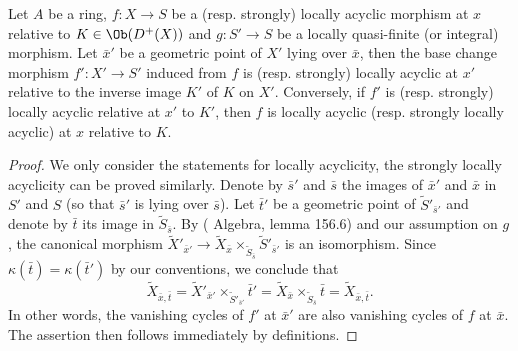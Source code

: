\begin{proposition}\label{scheme morphism locally acyclic base change by quasi-finite}
Let $A$ be a ring, $f:X\to S$ be a (resp. strongly) locally acyclic morphism at $x$ relative to $K\in\Ob(D^+(X))$ and $g:S'\to S$ be a locally quasi-finite (or integral) morphism. Let $\bar{x}'$ be a geometric point of $X'$ lying over $\bar{x}$, then the base change morphism $f':X'\to S'$ induced from $f$ is (resp. strongly) locally acyclic at $x'$ relative to the inverse image $K'$ of $K$ on $X'$. Conversely, if $f'$ is (resp. strongly) locally acyclic relative at $x'$ to $K'$, then $f$ is locally acyclic (resp. strongly locally acyclic) at $x$ relative to $K$. 
\end{proposition}
\begin{proof}
We only consider the statements for locally acyclicity, the strongly locally acyclicity can be proved similarly. Denote by $\bar{s}'$ and $\bar{s}$ the images of $\bar{x}'$ and $\bar{x}$ in $S'$ and $S$ (so that $\bar{s}'$ is lying over $\bar{s}$). Let $\bar{t}'$ be a geometric point of $\widetilde{S}'_{\bar{s}'}$ and denote by $\bar{t}$ its image in $\widetilde{S}_{\bar{s}}$. By (\cite{SP} Algebra, lemma 156.6) and our assumption on $g$, the canonical morphism $\widetilde{X}'_{\bar{x}'}\to\widetilde{X}_{\bar{x}}\times_{\widetilde{S}_{\bar{s}}}\widetilde{S}'_{\bar{s}'}$ is an isomorphism. Since $\kappa(\bar{t})=\kappa(\bar{t}')$ by our conventions, we conclude that
\[\widetilde{X}_{\bar{x},\bar{t}}=\widetilde{X}'_{\bar{x}'}\times_{\widetilde{S}'_{\bar{s}'}}\bar{t}'=\widetilde{X}_{\bar{x}}\times_{\widetilde{S}_{\bar{s}}}\bar{t}=\widetilde{X}_{\bar{x},\bar{t}}.\]
In other words, the vanishing cycles of $f'$ at $\bar{x}'$ are also vanishing cycles of $f$ at $\bar{x}$. The assertion then follows immediately by definitions.
\end{proof}

